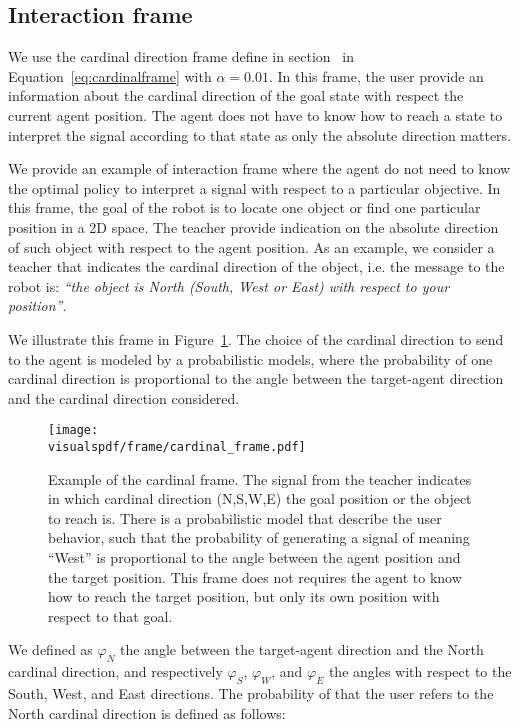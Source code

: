 \subsection{Interaction frame}

We use the cardinal direction frame define in section~\label{chapter:limitations:framegeneric} in Equation~\ref{eq:cardinalframe} with $\alpha = 0.01$. In this frame, the user provide an information about the cardinal direction of the goal state with respect the current agent position. The agent does not have to know how to reach a state to interpret the signal according to that state as only the absolute direction matters.

We provide an example of interaction frame where the agent do not need to know the optimal policy to interpret a signal with respect to a particular objective. In this frame, the goal of the robot is to locate one object or find one particular position in a 2D space. The teacher provide indication on the absolute direction of such object with respect to the agent position. As an example, we consider a teacher that indicates the cardinal direction of the object, i.e. the message to the robot is: \emph{``the object is North (South, West or East) with respect to your position''}.

We illustrate this frame in Figure~\ref{fig:cardinalframe}. The choice of the cardinal direction to send to the agent is modeled by a probabilistic models, where the probability of one cardinal direction is proportional to the angle between the target-agent direction and the cardinal direction considered.

\begin{figure}[!htbp]
    \centering
    \texttt{[image: \\visualspdf/frame/cardinal\_frame.pdf]}
    \caption{Example of the cardinal frame. The signal from the teacher indicates in which cardinal direction (N,S,W,E) the goal position or the object to reach is. There is a probabilistic model that describe the user behavior, such that the probability of generating a signal of meaning ``West'' is proportional to the angle between the agent position and the target position. This frame does not requires the agent to know how to reach the target position, but only its own position with respect to that goal.}
    \label{fig:cardinalframe}
\end{figure}

We defined as $\varphi_N$ the angle between the target-agent direction and the North cardinal direction, and respectively $\varphi_S$, $\varphi_W$, and $\varphi_E$ the angles with respect to the South, West, and East directions. The probability of that the user refers to the North cardinal direction is defined as follows:

